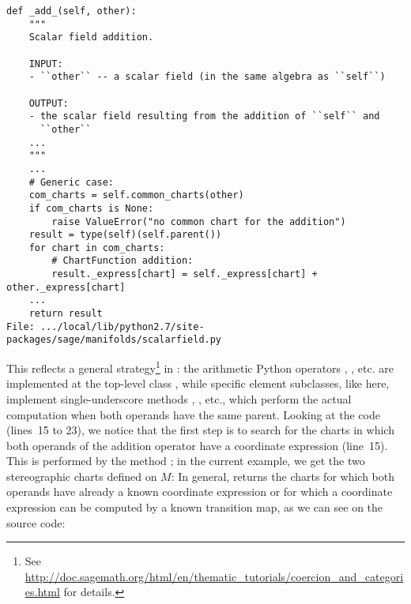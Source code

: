 \begin{lstlisting}
def _add_(self, other):
    """
    Scalar field addition.

    INPUT:
    - ``other`` -- a scalar field (in the same algebra as ``self``)

    OUTPUT:
    - the scalar field resulting from the addition of ``self`` and
      ``other``
    ...
    """
    ...
    # Generic case:
    com_charts = self.common_charts(other)
    if com_charts is None:
        raise ValueError("no common chart for the addition")
    result = type(self)(self.parent())
    for chart in com_charts:
        # ChartFunction addition:
        result._express[chart] = self._express[chart] + other._express[chart]
    ...
    return result
File: .../local/lib/python2.7/site-packages/sage/manifolds/scalarfield.py
\end{lstlisting}
This reflects a general strategy\footnote{See \url{http://doc.sagemath.org/html/en/thematic_tutorials/coercion_and_categories.html} for details.} in \Sage{}: the arithmetic Python operators
, , etc. are implemented at the
top-level class , while specific element subclasses,
like  here, implement single-underscore methods
, , etc., which perform the actual computation
when both operands have the same parent.
Looking at the code (lines~15 to 23), we notice that the first step is to search
for the charts in which both operands of the addition operator have a coordinate
expression (line~15). This is performed by the method ;
in the current example, we get the two stereographic charts defined on $M$:
In general,  returns the charts for which both operands
have already a known coordinate expression or for which a coordinate
expression can be computed by a known transition map, as we can see on the source
code:
